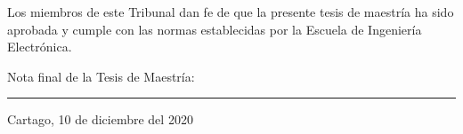 \vfill

Los miembros de este Tribunal dan fe de que la presente tesis de
maestría ha sido aprobada y cumple con las normas establecidas por la
Escuela de Ingeniería Electrónica.

\vfill

\begin{center}
  Nota final de la Tesis de Maestría: \rule{3cm}{0.5pt}
\end{center}
\vfill

\begin{center}
  Cartago, 10 de diciembre del 2020\par
\end{center}

\cleardoublepage

